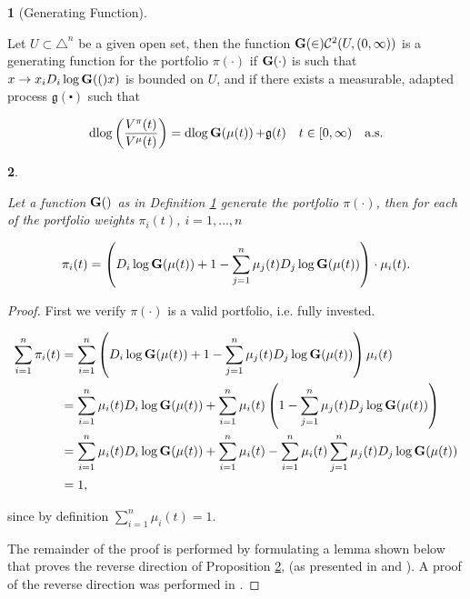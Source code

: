 \documentclass[british]{amsart} \usepackage{lmodern}
\numberwithin{equation}{section} \numberwithin{figure}{section}
\theoremstyle{plain} \newtheorem{thm}{\protect\theoremname}[section]
\theoremstyle{definition} \newtheorem{defn}[thm]{\protect\definitionname}
\theoremstyle{plain} \newtheorem{assumption}[thm]{\protect\assumptionname}
\theoremstyle{plain} \newtheorem{lem}[thm]{\protect\lemmaname}
\theoremstyle{plain} \newtheorem{prop}[thm]{\protect\propositionname}
\theoremstyle{remark} \newtheorem{rem}[thm]{\protect\remarkname}
\theoremstyle{plain} \newtheorem{cor}[thm]{\protect\corollaryname}
\renewcommand{\d}[1]{\mathop{\mathrm{d}{#1}}}
\newcommand{\rangei}{i=1,\dots,n} \newcommand{\measure}{\mathbb{P}}
\begin{document}
\begin{defn} [Generating Function] 
  \label{def:generatingfunction}

  Let $U \subset \triangle^{n}$ be a given open set, then the function
  $\mathbf{G}(\in)\mathcal{C}^{2}(U,(0,\infty))$ is a generating function for the
  portfolio $\pi(\cdot)$ if $\mathbf{G}(\cdot)$ is such that $x\to
  x_{i}D_{i}\log\mathbf{G}(()x)$ is bounded on $U$, and if there exists a
  measurable, adapted process $\mathfrak{g}(\centerdot)$ such that 

  \begin{equation}
    \d{ \log \left( \frac{V^{\pi}(t)}{V^{\mu}(t)} \right) } = 
    \d{\log{\Gmu}} + \g 
    \quad \ranget
    \quad \almostsurely
  \end{equation}

\end{defn}

\begin{prop} 
  \label{prop:generatingfunction}

  Let a function $\mathbf{G}()$ as in Definition \ref{def:generatingfunction}
  generate the portfolio $\pi(\cdot)$, then for each of the portfolio weights
  $\pi_{i}(t)$, $\rangei$

  \begin{equation}
    \label{eq:portfoliogeneratedbyG}
    \pi_{i}(t) = 
      \left( 
        D_{i}\log{\mathbf{G}(\mu(t))} + 1 - 
          \sum_{j=1}^{n} \mu_{j}(t) D_{j} \log{\mathbf{G}(\mu(t))}
      \right) \cdot \mu_{i}(t).
  \end{equation}

\end{prop}

\begin{proof}
  First we verify $\pi(\cdot)$ is a valid portfolio, i.e. fully invested.

   \begin{gather}
    \begin{split}
      \sum_{i=1}^{n} \pi_{i}(t) 
      &= \sum_{i=1}^{n} 
        \left( 
          D_{i}\log{\mathbf{G}(\mu(t))} + 1 - 
            \sum_{j=1}^{n} \mu_{j}(t)D_{j}\log{\mathbf{G}(\mu(t))}
        \right) \mu_{i}(t) \\
      &= 
        \sum_{i=1}^{n} \mu_{i}(t) D_{i}\log{\mathbf{G}(\mu(t))} + 
        \sum_{i=1}^{n} \mu_{i}(t)
        \left( 
          1 - \sum_{j=1}^{n} \mu_{j}(t)D_{j}\log{\mathbf{G}(\mu(t))}
        \right) \\
       &= 
        \sum_{i=1}^{n} \mu_{i}(t) D_{i}\log{\mathbf{G}(\mu(t))} + 
        \sum_{i=1}^{n} \mu_{i}(t) -
        \sum_{i=1}^{n} \mu_{i}(t) \sum_{j=1}^{n} \mu_{j}(t)D_{j}\log{\mathbf{G}(\mu(t))} \\
       &= 1,
    \end{split}
  \end{gather}

  since by definition $\sum_{i=1}^{n} \mu_{i}(t) = 1$.

  The remainder of the proof is performed by formulating a lemma shown below that
  proves the reverse direction of Proposition \ref{prop:generatingfunction}, (as
  presented in \cite{fernholz2009} and \cite{vervuurt2015}). A proof of the
  reverse direction was performed in \cite{fernholz1999pgf}. 

\end{proof}
\end{document}
